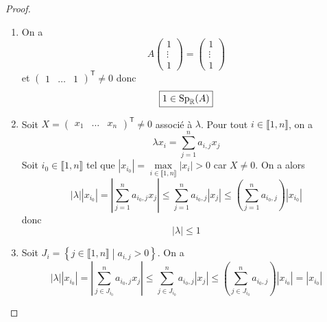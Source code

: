 \documentclass[12pt]{article}
\begin{document}
\begin{proof}
	\phantom{}
	\begin{enumerate}
		\item On a 
		\begin{equation}
			A\begin{pmatrix}
				1\\\vdots\\1
			\end{pmatrix}=\begin{pmatrix}
				1\\\vdots\\1
			\end{pmatrix}
		\end{equation}
		et $\begin{pmatrix}
			1&\dots&1
		\end{pmatrix}^{\mathsf{T}}\neq0$ donc 
		\begin{equation}
			\boxed{1\in\operatorname{Sp}_{\mathbb{R}}(A)}
		\end{equation}

		\item Soit $X=\begin{pmatrix}
			x_{1}&\dots&x_{n}
		\end{pmatrix}^{\mathsf{T}}\neq0$ associé à $\lambda$. Pour tout $i\in\llbracket1,n\rrbracket$, on a 
		\begin{equation}
			\lambda x_{i}=\sum_{j=1}^{n}a_{i,j}x_{j}
		\end{equation}
		Soit $i_{0}\in\llbracket1,n\rrbracket$ tel que $\left\lvert x_{i_{0}}\right\rvert=\max\limits_{i\in\llbracket1,n\rrbracket}\left\lvert x_{i}\right\rvert>0$ car $X\neq0$. On a alors 
		\begin{equation}
			\left\lvert\lambda\right\rvert\left\lvert x_{i_{0}}\right\rvert=\left\lvert\sum_{j=1}^{n}a_{i_{0},j}x_{j}\right\rvert\leqslant\sum_{j=1}^{n}a_{i_{0},j}\left\lvert x_{j}\right\rvert\leqslant\left(\sum_{j=1}^{n}a_{i_{0},j}\right)\left\lvert x_{i_{0}}\right\rvert
		\end{equation}
		donc 
		\begin{equation}
			\boxed{\left\lvert\lambda\right\rvert\leqslant1}
		\end{equation}

		\item Soit $J_{i}=\left\lbrace j\in\llbracket1,n\rrbracket\middle| a_{i,j}>0\right\rbrace$. On a 
		\begin{equation}
			\left\lvert\lambda\right\rvert\left\lvert x_{i_{0}}\right\rvert=\left\lvert\sum_{j\in J_{i_{0}}}^{n}a_{i_{0},j}x_{j}\right\rvert\leqslant\sum_{j\in J_{i_{0}}}^{n}a_{i_{0},j}\left\lvert x_{j}\right\rvert\leqslant\left(\sum_{j\in J_{i_{0}}}^{n}a_{i_{0},j}\right)\left\lvert x_{i_{0}}\right\rvert=\left\lvert x_{i_{0}}\right\rvert
		\end{equation}


\end{enumerate}
\end{proof}
\end{document}
